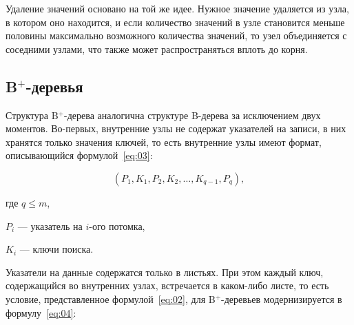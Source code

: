 Удаление значений основано на той же идее. Нужное значение удаляется из узла, в
котором оно находится, и если количество значений в узле становится меньше
половины максимально возможного количества значений, то узел объединяется с
соседними узлами, что также может распространяться вплоть до
корня.~ 

%
%


\subsection{B$^+$-деревья}

Структура B$^+$-дерева аналогична структуре B-дерева за исключением двух
моментов.  Во-первых, внутренние узлы не содержат указателей на записи, в них
хранятся только значения ключей, то есть внутренние узлы имеют формат,
описывающийся формулой~\eqref{eq:03}:

\begin{equation}\label{eq:03}
    (P_1, K_1, P_2, K_2, \dots, K_{q-1}, P_q),
\end{equation}

где $q \leqslant m$,

$P_i$ --- указатель на $i$-ого потомка,

$K_i$ --- ключи поиска.

Указатели на данные содержатся только в листьях. При этом каждый ключ,
содержащийся во внутренних узлах, встречается в каком-либо листе, то есть
условие, представленное формулой~\eqref{eq:02}, для B$^+$-деревьев
модернизируется в формулу~\eqref{eq:04}:

